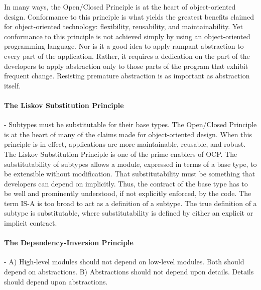 \documentclass{llncs}
\begin{document}
In many ways, the Open/Closed Principle is at the heart of object-oriented design. 
Conformance to this principle is what yields the greatest benefits claimed for object-oriented technology: flexibility,
reusability, and maintainability.
Yet conformance to this principle is not achieved simply by using an object-oriented programming language.
Nor is it a good idea to apply rampant abstraction to every part of the application. 
Rather, it requires a dedication on the part of the developers to apply abstraction only to those parts of the program that exhibit frequent change. Resisting premature abstraction is as important as abstraction itself.

\paragraph{The Liskov Substitution Principle} - Subtypes must be substitutable for their base types.
The Open/Closed Principle is at the heart of many of the claims made for object-oriented design.
When this principle is in effect, applications are more maintainable, reusable, and robust. 
The Liskov Substitution Principle is one of the prime enablers of OCP.
The substitutability of subtypes allows a module, expressed in terms of a base type, to be extensible without modification. 
That substitutability must be something that developers can depend on implicitly.
Thus, the contract of the base type has to be well and prominently understood, if not explicitly enforced, by the code.
The term IS-A is too broad to act as a definition of a subtype. 
The true definition of a subtype is substitutable, where substitutability is defined by either an explicit or implicit contract.

\paragraph{The Dependency-Inversion Principle} - A) High-level modules should not depend on low-level modules. 
Both should depend on abstractions. 
B) Abstractions should not depend upon details. 
Details should depend upon abstractions.
\end{document}
